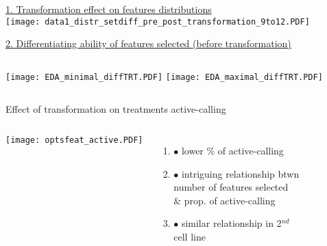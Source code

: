 \documentclass[11pt]{beamer}
\begin{document}
\begin{frame}
\underline{1. Transformation effect on features distributions} \\
\centering
\texttt{[image: data1\_distr\_setdiff\_pre\_post\_transformation\_9to12.PDF]}
\end{frame}

\begin{frame}
\underline{2. Differentiating ability of features selected (before transformation)} \\
\begin{columns}
  \centering
\texttt{[image: EDA\_minimal\_diffTRT.PDF]}
  \centering
  \texttt{[image: EDA\_maximal\_diffTRT.PDF]}
\end{columns}
\end{frame}


\begin{frame}{Effect of transformation on treatments active-calling}
\begin{columns}
\flushleft
\texttt{[image: optsfeat\_active.PDF]}
\begin{enumerate}[ ]
\item \hspace{-1.5cm} $\bullet$ lower \% of active-calling
\item \hspace{-1.5cm} $\bullet$ intriguing relationship btwn  \\ \hspace{-1.5cm} number of features selected \\ \hspace{-1.5cm} \& prop. of active-calling
\item \hspace{-1.5cm} $\bullet$ similar relationship in 2$^{nd}$ \\ \hspace{-1.5cm} cell line
\end{enumerate}
\end{columns}
\end{frame}
\end{document}
